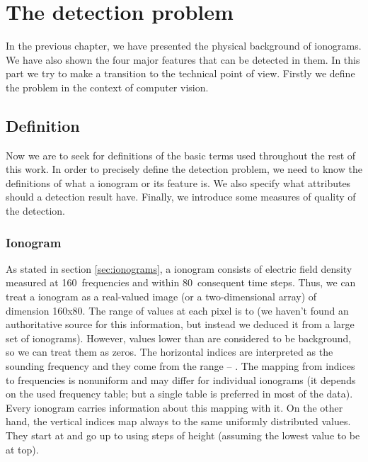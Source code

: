 \chapter{The detection problem}
In the previous chapter, we have presented the physical background of ionograms. We have also shown the four major features that can be detected in them. In this part we try to make a transition to the technical point of view. Firstly we define the problem in the context of computer vision. %

\section{Definition}
Now we are to seek for definitions of the basic terms used throughout the rest of this work. In order to precisely define the detection problem, we need to know the definitions of what a ionogram or its feature is. We also specify what attributes should a detection result have. Finally, we introduce some measures of quality of the detection.

\subsection{Ionogram}
As stated in section \ref{sec:ionograms}, a ionogram consists of electric field density measured at 160~frequencies and within 80~consequent time steps. Thus, we can treat a ionogram as a real-valued image (or a two-dimensional array) of dimension 160x80. The range of values at each pixel is  to  (we haven't found an authoritative source for this information, but instead we deduced it from a large set of ionograms). However, values lower than  are considered to be background, so we can treat them as zeros. The horizontal indices are interpreted as the sounding frequency and they come from the range  -- . The mapping from indices to frequencies is nonuniform and may differ for individual ionograms (it depends on the used frequency table; but a single table is preferred in most of the data). Every ionogram carries information about this mapping with it. On the other hand, the vertical indices map always to the same uniformly distributed values. They start at  and go up to  using steps of height  (assuming the lowest value to be at top). 

